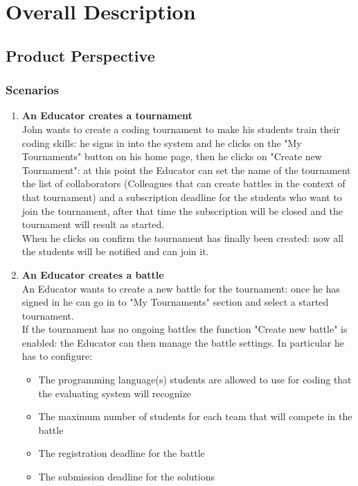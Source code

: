 \documentclass{article}
\begin{document}
\newpage

\section{Overall Description}
\subsection{Product Perspective}
\subsubsection{Scenarios}
\begin{enumerate}
  \item \textbf{An Educator creates a tournament\\}John wants to create a coding tournament to make his students train their
  coding skills: he signs in into the system and he clicks on the "My Tournaments" button on his home page, then he clicks on "Create new Tournament":
  at this point the Educator can set the name of the tournament the list of collaborators (Colleagues that can create battles in the context of that tournament) and a subscription
  deadline for the students who want to join the tournament, after that time the subscription will be closed and the tournament will result as started.\\
  When he clicks on confirm the tournament has finally been created: now all the students will be notified and can join it.\\
  \item \textbf{An Educator creates a battle\\}An Educator wants to create a new battle for the tournament: once he has signed in he can go in to "My Tournaments" section
  and select a started tournament.\\
  If the tournament has no ongoing battles the function "Create new battle" is enabled: the Educator can then manage the battle settings.
  In particular he has to configure:
  \begin{itemize}
    \item The programming language(s) students are allowed to use for coding that the evaluating system will recognize
    \item The maximum number of students for each team that will compete in the battle
    \item The registration deadline for the battle
    \item The submission deadline for the solutions

\end{itemize}
\end{enumerate}
\end{document}
